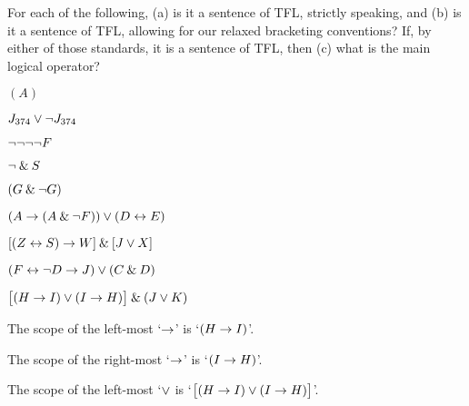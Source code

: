 \problempart
\label{pr.wiffTFL}
For each of the following, (a) is it a sentence of TFL, strictly speaking, and (b) is it a sentence of TFL, allowing for our relaxed bracketing conventions? If, by either of those standards, it is a sentence of TFL, then (c) what is the main logical operator?
\begin{earg}
\item $(A)$\hfill {}
\medskip

\item $J_{374} \vee {\neg} J_{374}$ \hfill {}
\medskip

\item ${\neg} {\neg} {\neg} {\neg} F$ \hfill {}
\medskip

\item ${\neg} \mathbin{\&} S$\hfill {}
\medskip

\item $(G \mathbin{\&} {\neg} G)$\hfill {}
\medskip

\item $(A \rightarrow (A \mathbin{\&} {\neg} F)) \vee (D \leftrightarrow E)$\hfill {}
\medskip

\item $[(Z \leftrightarrow S) \rightarrow W] \mathbin{\&} [J \vee X]$\hfill {}
\medskip

\item $(F \leftrightarrow {\neg} D \rightarrow J) \vee (C \mathbin{\&} D)$\hfill {}
\medskip
\end{earg}



\problempart $\bigl[(H \rightarrow I) \vee (I \rightarrow H)\bigr] \mathbin{\&} (J \vee K)$\medskip

\noindent The scope of the left-most `$\rightarrow$' is `$(H \rightarrow I)$'. 

\noindent The scope of the right-most `$\rightarrow$' is `$(I \rightarrow H)$'. 

\noindent The scope of the left-most `$\vee$ is `$\bigl[(H \rightarrow I) \vee (I \rightarrow H)\bigr]$'.

